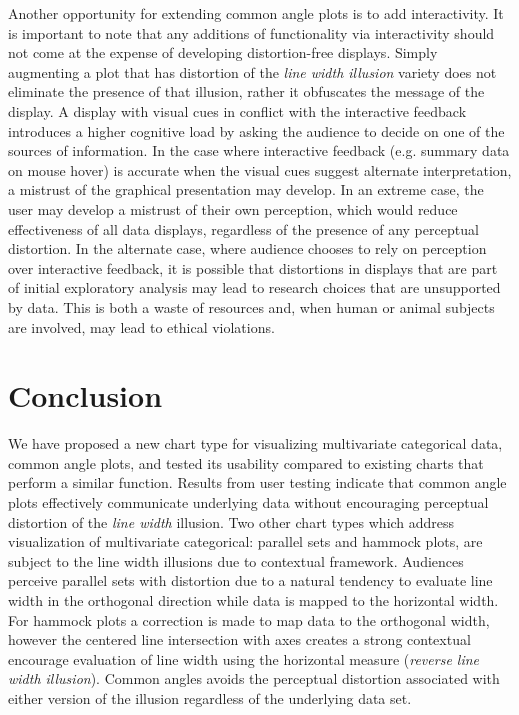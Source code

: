 Another opportunity for extending common angle plots is to add interactivity. It is important to note that
any additions of functionality via interactivity should not come at the expense of developing distortion-free
displays. Simply augmenting a plot that has distortion of the \emph{line width illusion} variety does not eliminate
the presence of that illusion, rather it obfuscates the message of the display. A display with visual cues in conflict
with the interactive feedback introduces a higher cognitive load by asking the audience to decide on one of the sources of information.
In the case where interactive feedback (e.g. summary data on mouse hover) is accurate when the visual cues
suggest alternate interpretation, a mistrust of the graphical presentation may develop. In an extreme case,
the user may develop a mistrust of their own perception, which would reduce effectiveness of all data displays, 
regardless of the presence of any perceptual distortion. In the alternate case, where audience chooses to
rely on perception over interactive feedback, it is possible that distortions in displays that are part of 
initial exploratory analysis may lead to research choices that are unsupported by data. This is both a waste of resources and, when human or animal subjects are involved, may lead to ethical violations.


\section{Conclusion}
We have proposed a new chart type for visualizing multivariate categorical data, common angle plots, 
and tested its usability compared to existing charts that perform a similar function. Results from user testing
indicate
that common angle plots effectively communicate underlying data without encouraging perceptual distortion of the 
\emph{line width} illusion.
Two other chart types which address visualization of multivariate categorical: parallel sets and hammock plots, 
are subject to the line width illusions due to 
contextual framework. Audiences perceive parallel sets with distortion due to a natural tendency to 
evaluate line width in the orthogonal direction while data is mapped to the horizontal width.
For hammock plots a correction is made to map data to the orthogonal width, however the centered line 
intersection with axes creates a strong contextual encourage evaluation of line width using the
horizontal measure (\emph{reverse line width illusion}). Common angles avoids the perceptual distortion 
associated with either version of the illusion regardless of the underlying data set.

